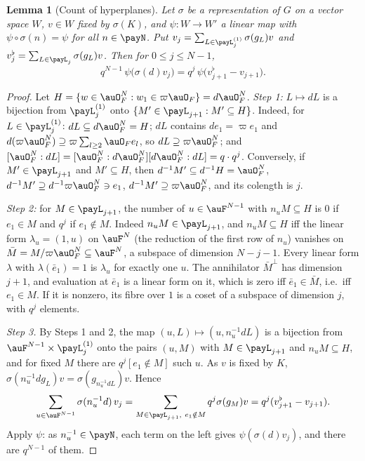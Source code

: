 \documentclass[10pt]{amsart}
\newtheorem{lemma}[theorem]{Lemma}
\theoremstyle{definition}
\theoremstyle{remark}
\begin{document}
\begin{lemma}[Count of hyperplanes]\label{pay:count}
Let $\sigma$ be a representation of $G$ on a vector space $W$, $v\in W$ fixed by $\sigma(K)$, and
$\psi\colon W\to W'$ a linear map with $\psi\circ\sigma(n)=\psi$ for all $n\in\payN$. Put $v_j=
\sum_{L\in\payL^{(1)}_j}\sigma(g_L)v$ and $v^\flat_j=\sum_{L\in\payL_j}\sigma(g_L)v$. Then for $0\le
j\le N-1$,
\[
q^{N-1}\,\psi\bigl(\sigma(d)v_j\bigr)=q^j\,\psi\bigl(v^\flat_{j+1}-v_{j+1}\bigr).
\]
\end{lemma}
\begin{proof}
Let $H=\{w\in\auO_F^N:w_1\in\varpi\auO_F\}=d\auO_F^N$. \emph{Step 1:} $L\mapsto dL$ is a bijection from
$\payL^{(1)}_j$ onto $\{M'\in\payL_{j+1}:M'\subseteq H\}$. Indeed, for $L\in\payL^{(1)}_j$: $dL
\subseteq d\auO_F^N=H$; $dL$ contains $de_1=\varpi e_1$ and $d(\varpi\auO_F^N)\supseteq\varpi
\sum_{l\ge2}\auO_Fe_l$, so $dL\supseteq\varpi\auO_F^N$; and $[\auO_F^N:dL]=[\auO_F^N:d\auO_F^N][d\auO_F^N:
dL]=q\cdot q^j$. Conversely, if $M'\in\payL_{j+1}$ and $M'\subseteq H$, then $d^{-1}M'\subseteq
d^{-1}H=\auO_F^N$, $d^{-1}M'\supseteq d^{-1}\varpi\auO_F^N\ni e_1$, $d^{-1}M'\supseteq\varpi\auO_F^N$,
and its colength is $j$.

\emph{Step 2:} for $M\in\payL_{j+1}$, the number of $u\in\auF^{N-1}$ with $n_uM\subseteq H$ is $0$
if $e_1\in M$ and $q^j$ if $e_1\notin M$. Indeed $n_uM\in\payL_{j+1}$, and $n_uM\subseteq H$ iff the
linear form $\lambda_u=(1,u)$ on $\auF^N$ (the reduction of the first row of $n_u$) vanishes on
$\bar M=M/\varpi\auO_F^N\subseteq\auF^N$, a subspace of dimension $N-j-1$. Every linear form $\lambda$
with $\lambda(\bar e_1)=1$ is $\lambda_u$ for exactly one $u$. The annihilator $\bar M^\perp$ has
dimension $j+1$, and evaluation at $\bar e_1$ is a linear form on it, which is zero iff $\bar e_1\in
\bar M$, i.e.\ iff $e_1\in M$. If it is nonzero, its fibre over $1$ is a coset of a subspace of
dimension $j$, with $q^j$ elements.

\emph{Step 3.} By Steps 1 and 2, the map $(u,L)\mapsto(u,n_u^{-1}dL)$ is a bijection from $\auF^{N-1}
\times\payL^{(1)}_j$ onto the pairs $(u,M)$ with $M\in\payL_{j+1}$ and $n_uM\subseteq H$, and for
fixed $M$ there are $q^j[e_1\notin M]$ such $u$. As $v$ is fixed by $K$, $\sigma(n_u^{-1}dg_L)v=
\sigma(g_{n_u^{-1}dL})v$. Hence
\[
\sum_{u\in\auF^{N-1}}\sigma(n_u^{-1}d)\,v_j=\sum_{M\in\payL_{j+1},\ e_1\notin M}q^j\sigma(g_M)v=q^j
(v^\flat_{j+1}-v_{j+1}).
\]
Apply $\psi$: as $n_u^{-1}\in\payN$, each term on the left gives $\psi(\sigma(d)v_j)$, and there are
$q^{N-1}$ of them.
\end{proof}
\end{document}
